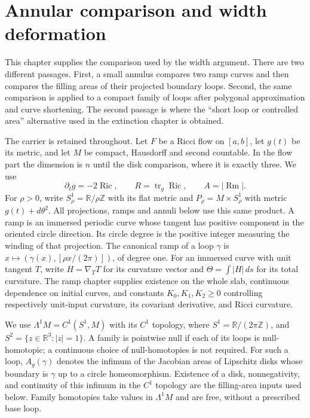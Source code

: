 \chapter{Annular comparison and width deformation}
\label{ch:annular-comparison}

This chapter supplies the comparison used by the width argument.  There are
two different passages.  First, a small annulus compares two ramp curves and
then compares the filling areas of their projected boundary loops.  Second,
the same comparison is applied to a compact family of loops after polygonal
approximation and curve shortening.  The second passage is where the
``short loop or controlled area'' alternative used in the extinction chapter
is obtained.

The carrier is retained throughout.  Let $F$ be a Ricci flow on
$[a,b]$, let $g(t)$ be its metric, and let $M$ be compact, Hausdorff and
second countable.  In the flow part the dimension is $n$ until the disk
comparison, where it is exactly three.  We use
\[
 \partial_tg=-2\operatorname{Ric},\qquad R=\operatorname{tr}_g\operatorname{Ric},
 \qquad A=|\operatorname{Rm}|.
\]
For $\rho>0$, write $S^1_\rho=\mathbb R/\rho\mathbb Z$ with its flat
metric and $P_\rho=M\times S^1_\rho$ with metric $g(t)+d\theta^2$.
All projections, ramps and annuli below use this same product.  A ramp is
an immersed periodic curve whose tangent has positive component in the
oriented circle direction.  Its circle degree is the positive integer
measuring the winding of that projection.  The canonical ramp of a loop
$\gamma$ is $x\mapsto(\gamma(x),[\rho x/(2\pi)])$, of degree one.
For an immersed curve with unit tangent $T$, write $H=\nabla_TT$ for
its curvature vector and $\Theta=\int|H|\,ds$ for its total curvature.
The ramp chapter supplies existence on the whole slab, continuous dependence
on initial curves, and constants $K_0,K_1,K_2\ge0$ controlling respectively
unit-input curvature, its covariant derivative, and Ricci curvature.

We use $\Lambda^1M=C^1(S^1,M)$ with its $C^1$ topology, where
$S^1=\mathbb R/(2\pi\mathbb Z)$, and $S^2=\{z\in\mathbb R^3:|z|=1\}$.
A family is pointwise null if each of its loops is null-homotopic; a
continuous choice of null-homotopies is not required.  For such a loop,
$A_g(\gamma)$ denotes the infimum of the Jacobian areas of Lipschitz disks
whose boundary is $\gamma$ up to a circle homeomorphism.  Existence of a disk,
nonnegativity, and continuity of this infimum in the $C^1$ topology are the
filling-area inputs used below.  Family homotopies take values in
$\Lambda^1M$ and are free, without a prescribed base loop.

